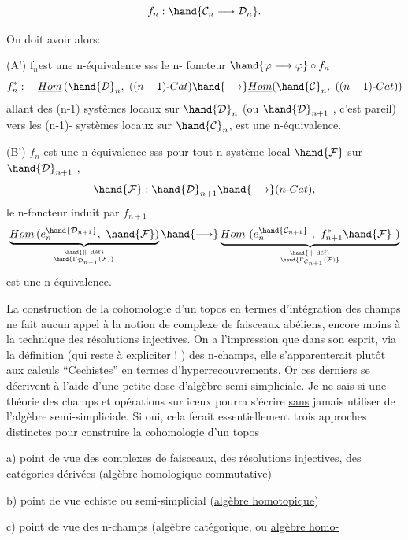  \hfill {}

\[ f_n : \hand{\mathcal{C}_n \longrightarrow \mathcal{D}_n} . \]

On doit avoir alors:

(A') f$_n$est une n-équivalence sss le n- foncteur $\hand{\varphi \longrightarrow \varphi}\circ f_n$
\[ f_n^*: \quad \underline{Hom}\, (\hand{\mathcal{D}}_n, \ ((n-1)\text{-}Cat) \hand{\longrightarrow} \underline{Hom}(\hand{\mathcal{C}}_n, \ ((n-1)\text{-}Cat)) \]
allant des (n-1) systèmes locaux sur $\hand{\mathcal{D}}_n$ (ou $\hand{\mathcal{D}}_{n+1}$ , c'est pareil) vers
les (n-1)- systèmes locaux sur $\hand{\mathcal{C}}_n$, est une n-équivalence.

(B') $f_n$ est une n-équivalence sss pour tout n-système local $\hand{\mathcal{F}}$ sur
$\hand{\mathcal{D}}_{n+1}$ ,
\[ \hand{\mathcal{F}} : \hand{\mathcal{D}}_{n+1} \hand{\longrightarrow} (n\text{-}Cat), \]
le n-foncteur induit par $f_{n+1}$
\[ \underbrace{\underline{Hom}\, ( e_n^{\hand{\mathcal{D}_{n+1}}}, \ \hand{\mathcal{F}} )}_{\hand{\parallel\ \text{déf}} \atop \hand{\Gamma_{\mathcal{D}_{n+1}}(\mathcal{F})}} \hand{\longrightarrow} \underbrace{\underline{Hom}\ (e_n^{\hand{\mathcal{C}_{n+1}}} \ , \ f^*_{n+1} \hand{\mathcal{F}} \ )}_{\hand{\parallel\ \text{déf}} \atop \hand{\Gamma_{\mathcal{C}_{n+1}}(\mathcal{F})}} \]
est une n-équivalence.

 \hand{(} La construction de la cohomologie d'un topos en termes d'intégration
des champs ne fait aucun appel à la notion de complexe de faisceaux abéliens,
encore moins à la technique des résolutions injectives. On a l'impression
que dans son esprit, via la définition (qui reste à expliciter ! ) des
n-champs, elle s'apparenterait plutôt aux calculs ``Cechistes'' en termes
d'hyperrecouvrements. Or ces derniers se décrivent à l'aide d'une petite
dose d'algèbre semi-simpliciale. Je ne sais si une théorie des champs
et opérations sur iceux pourra s'écrire \uline{sans} jamais utiliser de
l'algèbre semi-simpliciale. Si oui, cela ferait essentiellement trois
approches distinctes pour construire la cohomologie d'un topos \unsure{\over{;}{:}|:}

a) point de vue des complexes de faisceaux, des résolutions injectives,
des catégories dérivées (\uline{algèbre homologique commutative})\hand{,}

b) point de vue echiste ou semi-simplicial (\uline{algèbre homotopique})\hand{,}

c) point de vue des n-champs (algèbre catégorique, ou \uline{algèbre homo-}%

